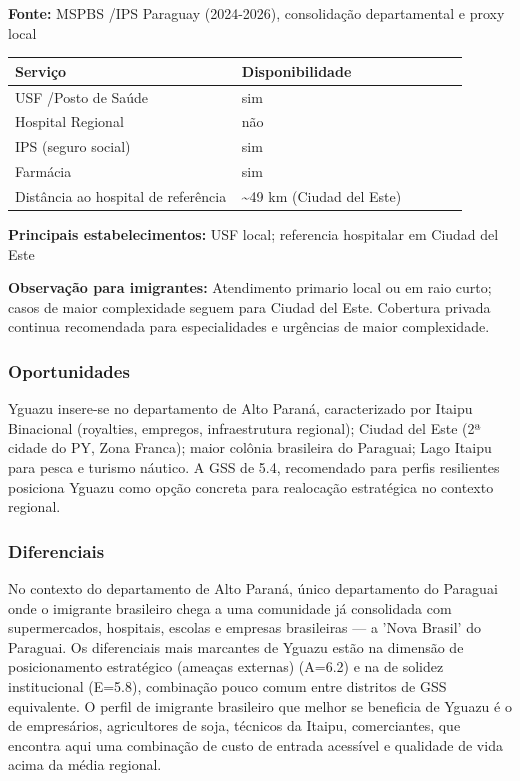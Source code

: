 \textbf{Fonte:} MSPBS /\allowbreak  IPS Paraguay (2024-2026), consolidação
departamental e proxy local

{\def\LTcaptype{none} %
\begin{longtable}{@{}>{\raggedright\arraybackslash}p{0.45\linewidth} >{\raggedright\arraybackslash}p{0.45\linewidth}@{}}
\toprule\noalign{}
Serviço & Disponibilidade \\
\midrule\noalign{}
\endhead
\bottomrule\noalign{}
\endlastfoot
USF /\allowbreak  Posto de Saúde & sim \\
Hospital Regional & não \\
IPS (seguro social) & sim \\
Farmácia & sim \\
Distância ao hospital de referência & \textasciitilde49 km (Ciudad del
Este) \\
\end{longtable}
}

\textbf{Principais estabelecimentos:} USF local; referencia hospitalar
em Ciudad del Este

\textbf{Observação para imigrantes:} Atendimento primario local ou em
raio curto; casos de maior complexidade seguem para Ciudad del Este.
Cobertura privada continua recomendada para especialidades e urgências
de maior complexidade.

\subsubsection*{Oportunidades}\label{oport-yguazu-1009}
Yguazu insere-se no departamento de Alto Paraná, caracterizado por Itaipu Binacional (royalties, empregos, infraestrutura regional); Ciudad del Este (2ª cidade do PY, Zona Franca); maior colônia brasileira do Paraguai; Lago Itaipu para pesca e turismo náutico. A GSS de 5.4, recomendado para perfis resilientes posiciona Yguazu como opção concreta para realocação estratégica no contexto regional.

\subsubsection*{Diferenciais}\label{dif-yguazu-1009}
No contexto do departamento de Alto Paraná, único departamento do Paraguai onde o imigrante brasileiro chega a uma comunidade já consolidada com supermercados, hospitais, escolas e empresas brasileiras — a 'Nova Brasil' do Paraguai. Os diferenciais mais marcantes de Yguazu estão na dimensão de posicionamento estratégico (ameaças externas) (A=6.2) e na de solidez institucional (E=5.8), combinação pouco comum entre distritos de GSS equivalente. O perfil de imigrante brasileiro que melhor se beneficia de Yguazu é o de empresários, agricultores de soja, técnicos da Itaipu, comerciantes, que encontra aqui uma combinação de custo de entrada acessível e qualidade de vida acima da média regional.
